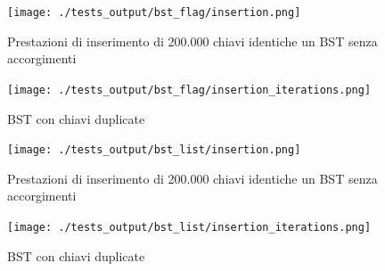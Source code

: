 \documentclass{article}
\begin{document}
\begin{minipage}[t]{\linewidth}
\begin{multicols}{2}
\begin{minipage}{\linewidth}
    \centering
    \label{tab:bst-flag-insertion-summarised}
\end{minipage}
\columnbreak
\begin{minipage}{\linewidth}
    \centering
    \label{tab:bst-list-insertion-summarised}
\end{minipage}

\end{multicols}

\end{minipage}







\begin{figure}[htbp]
 \begin{minipage}{0.5\textwidth}
    \centering
    \texttt{[image: ./tests\_output/bst\_flag/insertion.png]}
    \caption{Prestazioni di inserimento di 200.000 chiavi identiche un BST senza accorgimenti}
    \label{fig:bst-normal-insetion}
  \end{minipage}
  \begin{minipage}{0.5\textwidth}
    \centering
    \texttt{[image: ./tests\_output/bst\_flag/insertion\_iterations.png]}
    \caption{BST con chiavi duplicate}
    \label{fig:bst-normal-insetion-iterations}
  \end{minipage}%
\end{figure}







\begin{figure}[htbp]
 \begin{minipage}{0.5\textwidth}
    \centering
    \texttt{[image: ./tests\_output/bst\_list/insertion.png]}
    \caption{Prestazioni di inserimento di 200.000 chiavi identiche un BST senza accorgimenti}
    \label{fig:bst-normal-insetion}
  \end{minipage}
  \begin{minipage}{0.5\textwidth}
    \centering
    \texttt{[image: ./tests\_output/bst\_list/insertion\_iterations.png]}
    \caption{BST con chiavi duplicate}
    \label{fig:bst-normal-insetion-iterations}
  \end{minipage}%
\end{figure}
\end{document}
